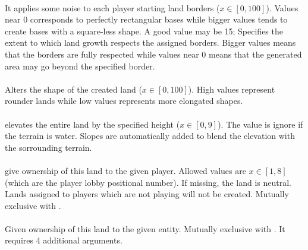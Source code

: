 \begin{appendices}
    \paragraph{}

    \paragraph{}
    It applies some noise to each player starting land borders ($x \in [0, 100]$). Values near 0 corresponds to perfectly rectangular bases while bigger values tends to create bases with a square-less shape. A good value may be 15;  Specifies the extent to which land growth respects the assigned borders. Bigger values means that the borders are fully respected while values near 0 means that the generated area may go beyond the specified border.

    \paragraph{}
    Alters the shape of the created land ($x \in [0, 100]$). High values represent rounder lands while low values represents more elongated shapes\cite{zetnus:2019,userpatch15}.

    \paragraph{}
    elevates the entire land by the specified height ($x \in [0, 9]$). The value is ignore if the terrain is water. Slopes are automatically added to blend the elevation with the sorrounding terrain.

    \paragraph{}
    give ownership of this land to the given player. Allowed values are $x \in [1,8]$ (which are the player lobby positional number). If missing, the land is neutral. Lands assigned to players which are not playing will not be created. Mutually exclusive with .

    \paragraph{}
    Given ownership of this land to the given entity. Mutually exclusive with . It requires 4 additional arguments.


\end{appendices}
